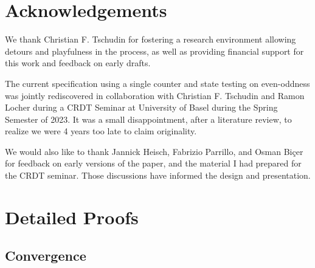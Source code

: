 \documentclass[9pt, oneside]{article}   	%
\begin{document}
\section{Acknowledgements}
\label{sec:acknowledgements}

We thank Christian F. Tschudin for fostering a research environment allowing detours and playfulness in the process, as well as providing financial support for this work and feedback on early drafts. 

The current specification using a single counter and state testing on even-oddness was jointly rediscovered in collaboration with Christian F. Tschudin and Ramon Locher during a CRDT Seminar at University of Basel during the Spring Semester of 2023. It was a small disappointment, after a literature review, to realize we were 4 years too late to claim originality.

We would also like to thank Jannick Heisch, Fabrizio Parrillo, and Osman Biçer for feedback on early versions of the paper, and the material I had prepared for the CRDT seminar. Those discussions have informed the design and presentation.




\newpage
\appendix

\section{Detailed Proofs}

\subsection{Convergence}
\label{sec:longer-proofs:convergence}
\end{document}
